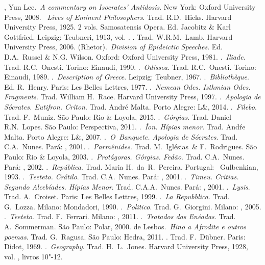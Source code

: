 \begin{bibliohedra}
, Yun Lee.~\emph{A commentary on Isocrates' Antidosis}. New York:
  Oxford University Press, 2008.
~\emph{Lives of Eminent Philosophers}. Trad. R.D.~Hicks. Harvard University Press, 1925. 2 vols.
 Samosatensis Opera. Ed. Jacobitz \& Karl Gottfried.
  Leipzig: Teubneri, 1913, vol. .
. Trad. W.R.M.~Lamb. Harvard University Press, 2006.
 (Rhetor).~\emph{Division of Epideictic Speeches}. Ed. D.A.~Russel \& N.G. Wilson.
  Oxford: Oxford University Press, 1981.
.~\emph{Iliade}. Trad. R.C.~Onesti. Torino: Einaudi, 1990.
.~\emph{Odissea}. Trad. R.C.~Onesti. Torino: Einaudi, 1989.
.~\emph{Description of Greece}. Leipzig: Teubner, 1967.
.~\emph{Bibliothèque}. Ed. R.~Henry. Paris: Les Belles
  Lettres, 1977.
.~\emph{Nemean Odes. Isthmian Odes. Fragments}. Trad. William H.~Race. Harvard University Press, 1997.
.~\emph{Apologia de Sócrates. Eutifron.
  Críton}. Trad. André Malta. Porto Alegre: L\&, 2014.
.~\emph{Filebo}. Trad. F.~Muniz. São Paulo:  Rio \& Loyola,
  2015.
.~\emph{Górgias}. Trad. Daniel R.N.~Lopes. São Paulo:
  Perspectiva, 2011.
.\emph{~Íon. Hípias menor}. Trad. Andŕe Malta. Porto
  Alegre: L\&, 2007.
.~\emph{O~Banquete. Apologia de Sócrates}. Trad. C.A.~Nunes.
  Pará: , 2001.
.~\emph{Parmênides}. Trad. M.~Iglésias~\& F.~Rodrigues. São
  Paulo:  Rio \& Loyola, 2003.
.~\emph{Protágoras. Górgias. Fedão}. Trad. C.A.~Nunes. Pará:
  , 2002.
.~\emph{República}. Trad. Maria H.~da~R.~Pereira. Portugal:
  ~Gulbenkian, 1993.
.~\emph{Teeteto. Crátilo}. Trad. C.A.~Nunes. Pará: , 2001.
.~\emph{Timeu. Crítias. Segundo Alcebíades. Hípias Menor}.
  Trad. C.A.A.~Nunes. Pará: , 2001.
.~\emph{Lysis}. Trad. A.~Croiset. Paris: Les Belles Lettres,
  1999.
.~\emph{La Repubblica}. Trad. G.~Lozza. Milano: Mondadori,
  1990.
.~\emph{Politico}. Trad. G.~Giorgini. Milano: , 2005.
.~\emph{Teeteto}. Trad. F.~Ferrari. Milano: , 2011.
.~\emph{Tratados das Enéadas}. Trad. A.~Sommerman. São Paulo: Polar, 2000.
 de Lesbos.~\emph{Hino a Afrodite e outros poemas}. Trad. G.~Ragusa. São Paulo: Hedra, 2011.
. Trad. F.~Dübner. Paris:
  Didot, 1969.
.~\emph{Geography}. Trad. H.~L.~Jones.
  Harvard University Press, 1928, vol. , livros 10"-12.
\end{bibliohedra}

